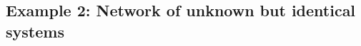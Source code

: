 \documentclass[journal,twoside,web]{ieeecolor}
\begin{document}

\subsection{Example 2: Network of unknown but identical systems}
\label{sub:network}
\end{document}

